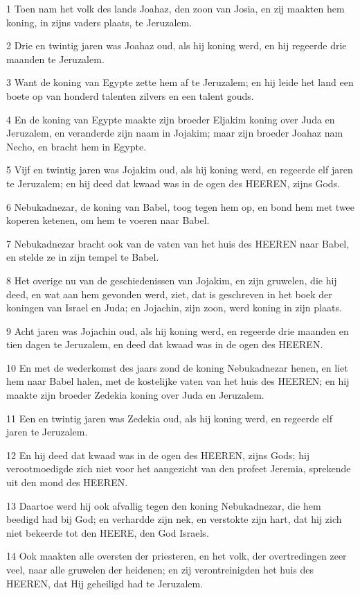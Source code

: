 \par 1 Toen nam het volk des lands Joahaz, den zoon van Josia, en zij maakten hem koning, in zijns vaders plaats, te Jeruzalem.
\par 2 Drie en twintig jaren was Joahaz oud, als hij koning werd, en hij regeerde drie maanden te Jeruzalem.
\par 3 Want de koning van Egypte zette hem af te Jeruzalem; en hij leide het land een boete op van honderd talenten zilvers en een talent gouds.
\par 4 En de koning van Egypte maakte zijn broeder Eljakim koning over Juda en Jeruzalem, en veranderde zijn naam in Jojakim; maar zijn broeder Joahaz nam Necho, en bracht hem in Egypte.
\par 5 Vijf en twintig jaren was Jojakim oud, als hij koning werd, en regeerde elf jaren te Jeruzalem; en hij deed dat kwaad was in de ogen des HEEREN, zijns Gods.
\par 6 Nebukadnezar, de koning van Babel, toog tegen hem op, en bond hem met twee koperen ketenen, om hem te voeren naar Babel.
\par 7 Nebukadnezar bracht ook van de vaten van het huis des HEEREN naar Babel, en stelde ze in zijn tempel te Babel.
\par 8 Het overige nu van de geschiedenissen van Jojakim, en zijn gruwelen, die hij deed, en wat aan hem gevonden werd, ziet, dat is geschreven in het boek der koningen van Israel en Juda; en Jojachin, zijn zoon, werd koning in zijn plaats.
\par 9 Acht jaren was Jojachin oud, als hij koning werd, en regeerde drie maanden en tien dagen te Jeruzalem, en deed dat kwaad was in de ogen des HEEREN.
\par 10 En met de wederkomst des jaars zond de koning Nebukadnezar henen, en liet hem naar Babel halen, met de kostelijke vaten van het huis des HEEREN; en hij maakte zijn broeder Zedekia koning over Juda en Jeruzalem.
\par 11 Een en twintig jaren was Zedekia oud, als hij koning werd, en regeerde elf jaren te Jeruzalem.
\par 12 En hij deed dat kwaad was in de ogen des HEEREN, zijns Gods; hij verootmoedigde zich niet voor het aangezicht van den profeet Jeremia, sprekende uit den mond des HEEREN.
\par 13 Daartoe werd hij ook afvallig tegen den koning Nebukadnezar, die hem beedigd had bij God; en verhardde zijn nek, en verstokte zijn hart, dat hij zich niet bekeerde tot den HEERE, den God Israels.
\par 14 Ook maakten alle oversten der priesteren, en het volk, der overtredingen zeer veel, naar alle gruwelen der heidenen; en zij verontreinigden het huis des HEEREN, dat Hij geheiligd had te Jeruzalem.
